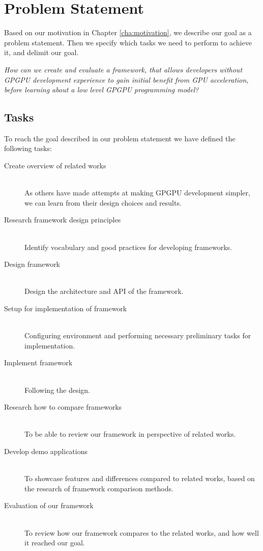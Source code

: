 \section{Problem Statement}
Based on our motivation in Chapter \ref{cha:motivation}, we describe our goal as a problem statement. Then we specify which tasks we need to perform to achieve it, and delimit our goal.

\textit{How can we create and evaluate a framework, that allows developers without GPGPU development experience to gain initial benefit from GPU acceleration, before learning about a low level GPGPU programming model?}

\subsection{Tasks} \label{cha:tasks}
To reach the goal described in our problem statement we have defined the following tasks:
\begin{description}
\item[Create overview of related works] \hfill \\
As others have made attempts at making GPGPU development simpler, we can learn from their design choices and results.
\item[Research framework design principles] \hfill \\
Identify vocabulary and good practices for developing frameworks.
\item[Design framework] \hfill \\
Design the architecture and API of the framework.
\item[Setup for implementation of framework] \hfill \\
Configuring environment and performing necessary preliminary tasks for implementation.
\item[Implement framework] \hfill \\
Following the design.
\item[Research how to compare frameworks] \hfill \\
To be able to review our framework in perspective of related works.
\item[Develop demo applications] \hfill \\
To showcase features and differences compared to related works, based on the research of framework comparison methods.
\item[Evaluation of our framework] \hfill \\
To review how our framework compares to the related works, and how well it reached our goal.
\end{description}

